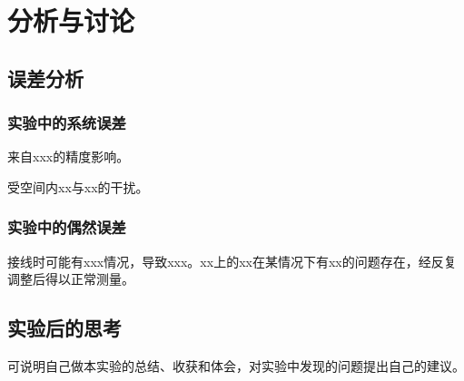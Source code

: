 \section{分析与讨论}

\subsection{误差分析}

\subsubsection{实验中的系统误差}
来自xxx的精度影响。

受空间内xx与xx的干扰。

\subsubsection{实验中的偶然误差}
接线时可能有xxx情况，导致xxx。xx上的xx在某情况下有xx的问题存在，经反复调整后得以正常测量。

\subsection{实验后的思考}
可说明自己做本实验的总结、收获和体会，对实验中发现的问题提出自己的建议。